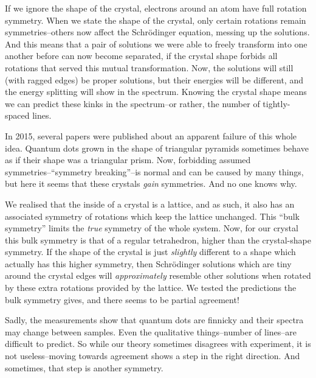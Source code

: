 If we ignore the shape of the crystal, electrons around an atom have full rotation symmetry. When we state the shape of the crystal, only certain rotations remain symmetries--others now affect the Schrödinger equation, messing up the solutions. And this means that a pair of solutions we were able to freely transform into one another before can now become separated, if the crystal shape forbids all rotations that served this mutual transformation. Now, the solutions will still (with ragged edges) be proper solutions, but their energies will be different, and the energy splitting will show in the spectrum. Knowing the crystal shape means we can predict these kinks in the spectrum--or rather, the number of tightly-spaced lines.

In 2015, several papers were published about an apparent failure of this whole idea. Quantum dots grown in the shape of triangular pyramids sometimes behave as if their shape was a triangular prism. Now, forbidding assumed symmetries--``symmetry breaking''--is normal and can be caused by many things, but here it seems that these crystals \textit{gain} symmetries. And no one knows why.

We realised that the inside of a crystal is a lattice, and as such, it also has an associated symmetry of rotations which keep the lattice unchanged. This ``bulk symmetry'' limits the \textit{true} symmetry of the whole system. Now, for our crystal this bulk symmetry is that of a regular tetrahedron, higher than the crystal-shape symmetry. If the shape of the crystal is just \textit{slightly} different to a shape which actually has this higher symmetry, then Schrödinger solutions which are tiny around the crystal edges will \textit{approximately} resemble other solutions when rotated by these extra rotations provided by the lattice. We tested the predictions the bulk symmetry gives, and there seems to be partial agreement!

Sadly, the measurements show that quantum dots are finnicky and their spectra may change between samples. Even the qualitative things--number of lines--are difficult to predict. So while our theory sometimes disagrees with experiment, it is not useless--moving towards agreement shows a step in the right direction. And sometimes, that step is another symmetry.

\restoregeometry